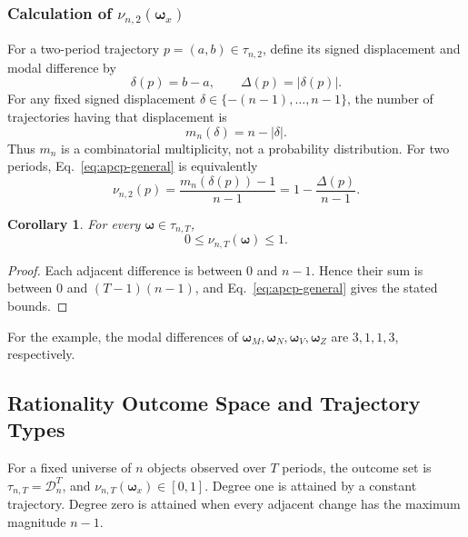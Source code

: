 \documentclass[conference]{IEEEtran}
\theoremstyle{plain}
\newtheorem{corollary}{Corollary}
\theoremstyle{definition}
\theoremstyle{remark}
\begin{document}
	\subsubsection{Calculation of \texorpdfstring{$\nu_{n,2}(\boldsymbol\omega_x)$}{APCP}}
		For a two-period trajectory $p=(a,b)\in\tau_{n,2}$, define its signed displacement and modal difference by
		\begin{equation}\label{eq:modal-difference}
			\delta(p)=b-a,
			\qquad
			\Delta(p)=\lvert\delta(p)\rvert.
		\end{equation}
		For any fixed signed displacement $\delta\in\{-(n-1),\ldots,n-1\}$, the number of trajectories having that displacement is
		\begin{equation}
			m_n(\delta)=n-\lvert\delta\rvert.
		\end{equation}
		Thus $m_n$ is a combinatorial multiplicity, not a probability distribution. For two periods, Eq.~\eqref{eq:apcp-general} is equivalently
		\begin{equation}\label{eq:apcp-direct}
			\nu_{n,2}(p)
			=\frac{m_n(\delta(p))-1}{n-1}
			=1-\frac{\Delta(p)}{n-1}.
		\end{equation}
		\begin{corollary}\label{cor:apcp-unit-interval}
			For every $\boldsymbol\omega\in\tau_{n,T}$,
			\begin{equation}
				0\leq\nu_{n,T}(\boldsymbol\omega)\leq1.
			\end{equation}
		\end{corollary}
		\begin{proof}
			Each adjacent difference is between $0$ and $n-1$. Hence their sum is between $0$ and $(T-1)(n-1)$, and Eq.~\eqref{eq:apcp-general} gives the stated bounds.
		\end{proof}
		For the example, the modal differences of $\boldsymbol\omega_M,\boldsymbol\omega_N,\boldsymbol\omega_V,\boldsymbol\omega_Z$ are $3,1,1,3$, respectively.
	\subsection{Rationality Outcome Space and Trajectory Types}
	For a fixed universe of $n$ objects observed over $T$ periods, the outcome set is $\tau_{n,T}=\mathcal D_n^T$, and $\nu_{n,T}(\boldsymbol\omega_x)\in[0,1]$. Degree one is attained by a constant trajectory. Degree zero is attained when every adjacent change has the maximum magnitude $n-1$.
\end{document}
